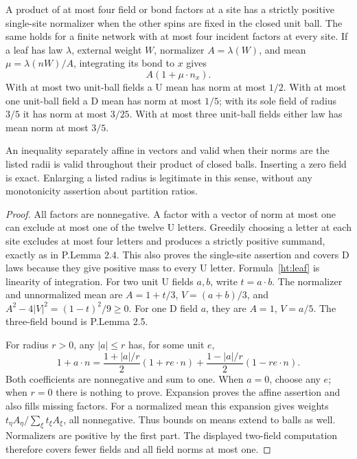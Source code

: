 \begin{htlem}
\label{ht:elementary}
A product of at most four field or bond factors at a site has a strictly
positive single-site normalizer when the other spins are fixed in the
closed unit ball. The same holds for a finite network with at most four
incident factors at every site. If a leaf has law \(\lambda\), external
weight \(W\), normalizer \(A=\lambda(W)\), and mean
\(\mu=\lambda(nW)/A\), integrating its bond to \(x\) gives
\begin{equation}\label{ht:leaf}
 A(1+\mu\cdot n_x).
\end{equation}
With at most two unit-ball fields a U mean has norm at most \(1/2\).
With at most one unit-ball field a D mean has norm at most \(1/5\);
with its sole field of radius \(3/5\) it has norm at most \(3/25\).
With at most three unit-ball fields either law has mean norm at most
\(3/5\).

An inequality separately affine in vectors and valid when their norms
are the listed radii is valid throughout their product of closed balls.
Inserting a zero field is exact. Enlarging a listed radius is legitimate
in this sense, without any monotonicity assertion about partition ratios.
\end{htlem}
\begin{proof}
All factors are nonnegative. A factor with a vector of norm at most one
can exclude at most one of the twelve U letters. Greedily choosing a
letter at each site excludes at most four letters and produces a strictly
positive summand, exactly as in P.Lemma 2.4. This also proves the
single-site assertion and covers D laws because they give positive mass
to every U letter. Formula~\eqref{ht:leaf} is linearity of integration.
For two unit U fields \(a,b\), write \(t=a\cdot b\). The normalizer
and unnormalized mean are \(A=1+t/3\), \(V=(a+b)/3\), and
\(A^2-4|V|^2=(1-t)^2/9\ge0\). For one D field \(a\), they are
\(A=1\), \(V=a/5\). The three-field bound is P.Lemma 2.5.

For radius \(r>0\), any \(|a|\le r\) has, for some unit \(e\),
\begin{equation}\label{ht:convexfield}
 1+a\cdot n=\frac{1+|a|/r}{2}(1+re\cdot n)
             +\frac{1-|a|/r}{2}(1-re\cdot n).
\end{equation}
Both coefficients are nonnegative and sum to one. When \(a=0\),
choose any \(e\); when \(r=0\) there is nothing to prove.
Expansion proves the affine assertion and also fills missing factors.
For a normalized mean this expansion gives weights
\(t_\eta A_\eta/\sum_\xi t_\xi A_\xi\), all nonnegative.
Thus bounds on means extend to balls as well. Normalizers are positive
by the first part. The displayed two-field computation therefore covers
fewer fields and all field norms at most one.
\end{proof}

